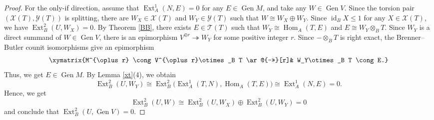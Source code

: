 \documentclass[reqno,12pt]{amsart}
\numberwithin{equation}{section}
\theoremstyle{plain}
\theoremstyle{definition}
\begin{document}
\begin{proof}
For the only-if direction, assume that
$\operatorname{Ext}_A^1(N,E)=0$ for any
$E\in\operatorname{Gen}M$, and take any
$W\in\operatorname{Gen}V$. Since the torsion pair
$(\mathcal{X}(T),\mathcal{Y}(T))$ is splitting, there are
$W_X\in\mathcal{X}(T)$ and $W_Y\in\mathcal{Y}(T)$ such that
$W\cong W_X\oplus W_Y$. Since $\operatorname{id}_B X\leq1$ for any $X\in\mathcal{X}(T)$,
we have $\operatorname{Ext}_B^2(U,W_X)=0$. By Theorem \ref{BB}, there exists $E\in\mathcal{T}(T)$ such that
$W_Y\cong\operatorname{Hom}_A(T,E)$ and $E\cong W_Y\otimes_B T$.
Since $W_Y$ is a direct summand of $W\in\operatorname{Gen}V$,
there is an epimorphism
$V^{\oplus r}\twoheadrightarrow W_Y$ for some positive integer $r$. Since $-\otimes_B T$ is right exact, the
Brenner--Butler counit isomorphisms give an epimorphism
\[\xymatrix{M^{\oplus r}
\cong
V^{\oplus r}\otimes_B T
\ar@{->>}[r]&
W_Y\otimes_B T
\cong E.}
\]
Thus, we get $E\in\operatorname{Gen}M$. By Lemma \ref{xt}(4), we obtain
\[
\operatorname{Ext}_B^2(U,W_Y)
\cong
\operatorname{Ext}_B^2
 \bigl(\operatorname{Ext}_A^1(T,N),
       \operatorname{Hom}_A(T,E)\bigr)
\cong
\operatorname{Ext}_A^1(N,E)
=0.
\]
Hence, we get
\[
\operatorname{Ext}_B^2(U,W)
\cong
\operatorname{Ext}_B^2(U,W_X)
\oplus
\operatorname{Ext}_B^2(U,W_Y)
=0
\]
and conclude that
$\operatorname{Ext}_B^2(U,\operatorname{Gen}V)=0$.


\end{proof}
\end{document}
